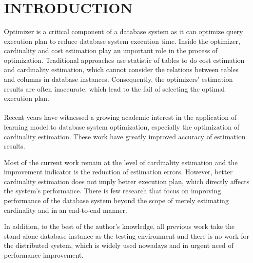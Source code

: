 \section{INTRODUCTION}
    \paragraph{}
    Optimizer is a critical component of a database system as it can optimize query execution plan to reduce database
    system execution time\cite{howgood}. Inside the optimizer, cardinality and cost estimation play 
    an important role in the process of optimization\cite{howgood}. Traditional approaches use statistic of tables to 
    do cost estimation and cardinality estimation\cite{Self-Tuning-Histograms,independenceisgood,lohman2014query}, 
    which cannot consider the relations between tables and columns in database instances\cite{howgood,lohman2014query}. 
    Consequently, the optimizers' estimation results are often inaccurate, which lead to the fail of selecting the optimal execution plan. 
    \paragraph{}
    Recent years have witnessed a growing academic interest in
    \cite{marcus2019neo, yang2020neurocard, wu2021unified, yang2019deep, sun2019end} the application of learning model 
    to database system optimization, especially the optimization of cardinality estimation. These work have greatly improved 
    accuracy of estimation results. 
    
    Most of the current work remain 
    at the level of cardinality estimation\cite{marcus2019neo, yang2020neurocard,wu2021unified,yang2019deep}
    and the improvement indicator is the reduction of estimation errors. However, better cardinality estimation does not imply better execution plan, which 
    directly affects the system's performance. There is few research that\cite{sun2019end}
    focus on improving performance of the database system beyond the scope of merely estimating cardinality and in an end-to-end manner. 
    
    In addition, to the best of the author's knowledge, all previous work take the stand-alone database instance as the testing environment and there is no  
    work for the distributed system, which is widely used nowadays and in urgent need of performance improvement.
    
